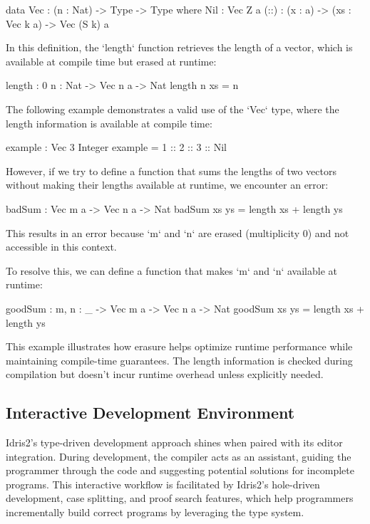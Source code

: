 \documentclass[]{rptuseminar}
\begin{document}
\begin{idris}
data Vec : (n : Nat) -> Type -> Type where
    Nil : Vec Z a
    (::) : (x : a) -> (xs : Vec k a) -> Vec (S k) a
\end{idris}

In this definition, the `length` function retrieves the length of a vector, which is available at compile time but erased at runtime:

\begin{idris}
length : {0 n : Nat} -> Vec n a -> Nat
length {n} xs = n
\end{idris}

The following example demonstrates a valid use of the `Vec` type, where the length information is available at compile time:

\begin{idris}
example : Vec 3 Integer
example = 1 :: 2 :: 3 :: Nil
\end{idris}

However, if we try to define a function that sums the lengths of two vectors without making their lengths available at runtime, we encounter an error:

\begin{idris}
badSum : Vec m a -> Vec n a -> Nat
badSum xs ys = length xs + length ys
\end{idris}

This results in an error because `m` and `n` are erased (multiplicity 0) and not accessible in this context.

To resolve this, we can define a function that makes `m` and `n` available at runtime:

\begin{idris}
goodSum : {m, n : _} -> Vec m a -> Vec n a -> Nat
goodSum xs ys = length xs + length ys
\end{idris}

This example illustrates how erasure helps optimize runtime performance while maintaining compile-time guarantees. The length information is checked during compilation but doesn't incur runtime overhead unless explicitly needed.

\subsection{Interactive Development Environment}  
Idris2's type-driven development approach shines when paired with its editor integration. During development, the compiler acts as an assistant, guiding the programmer through the code and suggesting potential solutions for incomplete programs. This interactive workflow is facilitated by Idris2's hole-driven development, case splitting, and proof search features, which help programmers incrementally build correct programs by leveraging the type system.
\end{document}
